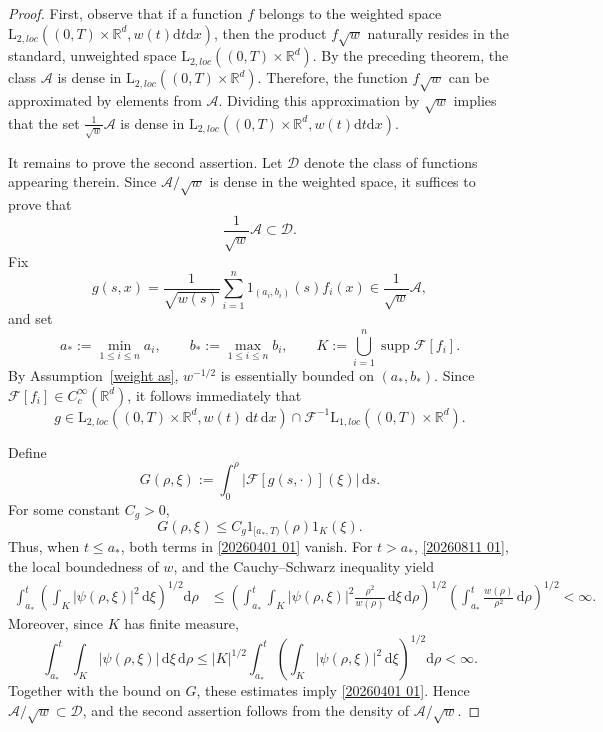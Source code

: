 \documentclass[10pt,a4paper]{amsart}
\newcommand\bR{\mathbb{R}}
\newcommand\cA{\mathcal{A}}
\newcommand\cF{\mathcal{F}}
\begin{document}
\begin{proof}
First, observe that if a function $f$ belongs to the weighted space $\mathrm{L}_{2,loc}\left( (0,T) \times \bR^d, w(t)\mathrm{d}t\mathrm{d}x \right)$, then the product $f \sqrt{w}$ naturally resides in the standard, unweighted space $\mathrm{L}_{2,loc}\left( (0,T) \times \bR^d \right)$.
By the preceding theorem, the class $\cA$ is dense in $\mathrm{L}_{2,loc}\left( (0,T) \times \bR^d \right)$. 
Therefore, the function $f \sqrt{w}$ can be approximated by elements from $\cA$. Dividing this approximation by $\sqrt{w}$ implies that the set $\frac{1}{\sqrt{w}} \cA$ is dense in $\mathrm{L}_{2,loc}\left( (0,T) \times \bR^d, w(t)\mathrm{d}t\mathrm{d}x \right)$.

It remains to prove the second assertion. 
Let $\mathscr{D}$ denote the class of functions appearing therein. 
Since $\cA/\sqrt w$ is dense in the weighted space, it suffices to prove that
$$
\frac{1}{\sqrt w}\cA\subset\mathscr D.
$$
Fix
$$
g(s,x)
=
\frac{1}{\sqrt{w(s)}}
\sum_{i=1}^n1_{(a_i,b_i)}(s)f_i(x)
\in\frac{1}{\sqrt w}\cA,
$$
and set
$$
a_*:=\min_{1\leq i\leq n}a_i,
\qquad
b_*:=\max_{1\leq i\leq n}b_i,
\qquad
K:=\bigcup_{i=1}^n\operatorname{supp}\cF[f_i].
$$
By Assumption~\ref{weight as}, $w^{-1/2}$ is essentially bounded on
$(a_*,b_*)$. Since $\cF[f_i]\in C_c^\infty(\bR^d)$, it follows immediately
that
$$
g\in
\mathrm{L}_{2,loc}\left((0,T)\times\bR^d,w(t)\,\mathrm dt\,\mathrm dx\right)
\cap
\cF^{-1}\mathrm{L}_{1,loc}\left((0,T)\times\bR^d\right).
$$

Define
$$
G(\rho,\xi)
:=
\int_0^\rho
\left|\cF[g(s,\cdot)](\xi)\right|\,\mathrm ds.
$$
For some constant $C_g>0$,
$$
G(\rho,\xi)
\leq
C_g1_{[a_*,T)}(\rho)1_K(\xi).
$$
Thus, when $t\leq a_*$, both terms in \eqref{20260401 01} vanish. For
$t>a_*$, \eqref{20260811 01}, the local boundedness of $w$, and the
Cauchy--Schwarz inequality yield
\begin{align*}
\int_{a_*}^t
\left(
    \int_K|\psi(\rho,\xi)|^2\,\mathrm d\xi
\right)^{1/2}
\mathrm d\rho
&\leq
\left(
    \int_{a_*}^t\int_K
    |\psi(\rho,\xi)|^2\frac{\rho^2}{w(\rho)}
    \,\mathrm d\xi\,\mathrm d\rho
\right)^{1/2}
\left(
    \int_{a_*}^t\frac{w(\rho)}{\rho^2}\,\mathrm d\rho
\right)^{1/2}
<\infty.
\end{align*}
Moreover, since $K$ has finite measure,
$$
\int_{a_*}^t\int_K|\psi(\rho,\xi)|\,\mathrm d\xi\,\mathrm d\rho
\leq
|K|^{1/2}
\int_{a_*}^t
\left(
    \int_K|\psi(\rho,\xi)|^2\,\mathrm d\xi
\right)^{1/2}
\mathrm d\rho
<\infty.
$$
Together with the bound on $G$, these estimates imply \eqref{20260401 01}. 
Hence $\cA/\sqrt w\subset\mathscr D$, and the second assertion follows from the density of $\cA/\sqrt w$.
\end{proof}
\end{document}
